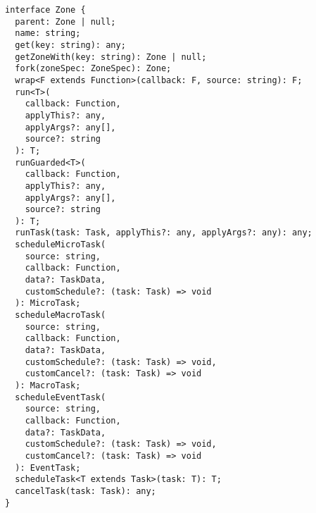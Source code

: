 \begin{verbatim}
interface Zone {
  parent: Zone | null;
  name: string;
  get(key: string): any;
  getZoneWith(key: string): Zone | null;
  fork(zoneSpec: ZoneSpec): Zone;
  wrap<F extends Function>(callback: F, source: string): F;
  run<T>(
    callback: Function,
    applyThis?: any,
    applyArgs?: any[],
    source?: string
  ): T;
  runGuarded<T>(
    callback: Function,
    applyThis?: any,
    applyArgs?: any[],
    source?: string
  ): T;
  runTask(task: Task, applyThis?: any, applyArgs?: any): any;
  scheduleMicroTask(
    source: string,
    callback: Function,
    data?: TaskData,
    customSchedule?: (task: Task) => void
  ): MicroTask;
  scheduleMacroTask(
    source: string,
    callback: Function,
    data?: TaskData,
    customSchedule?: (task: Task) => void,
    customCancel?: (task: Task) => void
  ): MacroTask;
  scheduleEventTask(
    source: string,
    callback: Function,
    data?: TaskData,
    customSchedule?: (task: Task) => void,
    customCancel?: (task: Task) => void
  ): EventTask;
  scheduleTask<T extends Task>(task: T): T;
  cancelTask(task: Task): any;
}
\end{verbatim}
